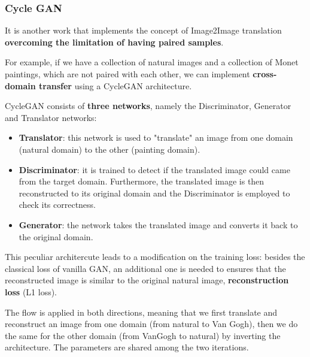 \subsubsection{Cycle GAN}

It is another work that implements the concept of Image2Image translation \textbf{overcoming the limitation of having paired samples}.

For example, if we have a collection of natural images and a collection of Monet paintings, which are not paired with each other, we can implement \textbf{cross-domain transfer} using a CycleGAN architecture.

CycleGAN consists of \textbf{three networks}, namely the Discriminator, Generator and Translator networks: 

\begin{itemize}
    \item \textbf{Translator}: this network is used to "translate" an image from one domain (natural domain) to the other (painting domain).
    \vspace{5 pt}

    \item \textbf{Discriminator}: it is trained to detect if the translated image could came from the target domain. Furthermore, the translated image is then reconstructed to its original domain and the Discriminator is employed to check its correctness.
    \vspace{5 pt}

   \item \textbf{Generator}: the network  takes the translated image and converts it back to the original domain. 
\end{itemize}



This peculiar architercute leads to a modification on the training loss: besides the classical loss of vanilla GAN, an additional one is needed to ensures that the reconstructed image is similar to the original natural image,   \textbf{ reconstruction loss} (L1 loss).


The flow is applied in both directions, meaning that we first translate and reconstruct an image from one domain (from natural to Van Gogh), then we do the same for the other domain (from VanGogh to natural) by inverting the architecture. The parameters are shared among the two iterations. 




